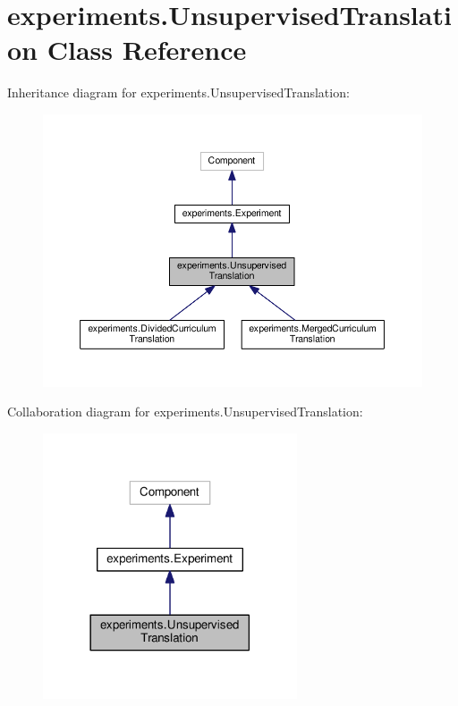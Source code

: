 \hypertarget{classexperiments_1_1UnsupervisedTranslation}{}\section{experiments.\+Unsupervised\+Translation Class Reference}
\label{classexperiments_1_1UnsupervisedTranslation}


Inheritance diagram for experiments.\+Unsupervised\+Translation\+:
\nopagebreak
\begin{figure}[H]
\begin{center}
\leavevmode
\includegraphics[width=350pt]{classexperiments_1_1UnsupervisedTranslation__inherit__graph}
\end{center}
\end{figure}


Collaboration diagram for experiments.\+Unsupervised\+Translation\+:
\nopagebreak
\begin{figure}[H]
\begin{center}
\leavevmode
\includegraphics[width=213pt]{classexperiments_1_1UnsupervisedTranslation__coll__graph}
\end{center}
\end{figure}
